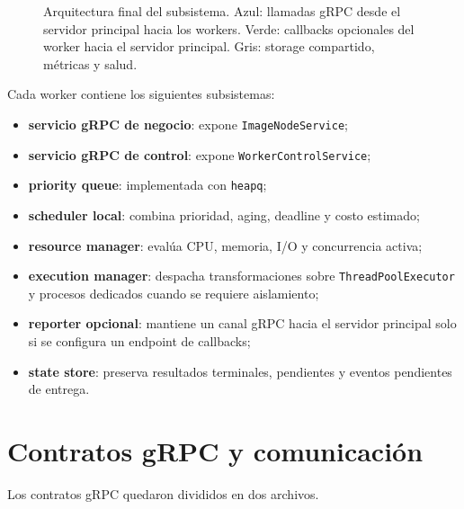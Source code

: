 \documentclass[conference]{IEEEtran}
\begin{document}
\begin{figure}[t]
\caption{Arquitectura final del subsistema. Azul: llamadas gRPC desde el servidor principal hacia los workers. Verde: callbacks opcionales del worker hacia el servidor principal. Gris: storage compartido, métricas y salud.}
\label{fig:architecture}
\end{figure}

Cada worker contiene los siguientes subsistemas:
\begin{itemize}[leftmargin=*]
\item \textbf{servicio gRPC de negocio}: expone \texttt{ImageNodeService};
\item \textbf{servicio gRPC de control}: expone \texttt{WorkerControlService};
\item \textbf{priority queue}: implementada con \texttt{heapq};
\item \textbf{scheduler local}: combina prioridad, aging, deadline y costo estimado;
\item \textbf{resource manager}: evalúa CPU, memoria, I/O y concurrencia activa;
\item \textbf{execution manager}: despacha transformaciones sobre \texttt{ThreadPoolExecutor} y procesos dedicados cuando se requiere aislamiento;
\item \textbf{reporter opcional}: mantiene un canal gRPC hacia el servidor principal solo si se configura un endpoint de callbacks;
\item \textbf{state store}: preserva resultados terminales, pendientes y eventos pendientes de entrega.
\end{itemize}

\section{Contratos gRPC y comunicación}
Los contratos gRPC quedaron divididos en dos archivos.
\end{document}
